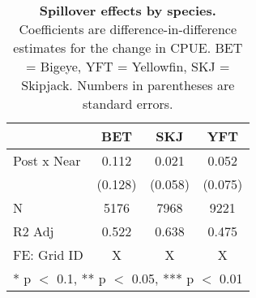 \begin{table}

\caption{\label{tab:spp_reg}\textbf{Spillover effects by species.} Coefficients are
             difference-in-difference estimates for the change in CPUE. BET = Bigeye, YFT = Yellowfin, SKJ = Skipjack. Numbers in parentheses are standard errors.}
\centering
\begin{tabular}[t]{lccc}
\toprule
  & BET & SKJ & YFT\\
\midrule
Post x Near & \num{0.112} & \num{0.021} & \num{0.052}\\
 & (\num{0.128}) & (\num{0.058}) & (\num{0.075})\\
\midrule
N & \num{5176} & \num{7968} & \num{9221}\\
R2 Adj & \num{0.522} & \num{0.638} & \num{0.475}\\
FE: Grid ID & X & X & X\\
\bottomrule
\multicolumn{4}{l}{\rule{0pt}{1em}* p $<$ 0.1, ** p $<$ 0.05, *** p $<$ 0.01}\\
\end{tabular}
\end{table}
